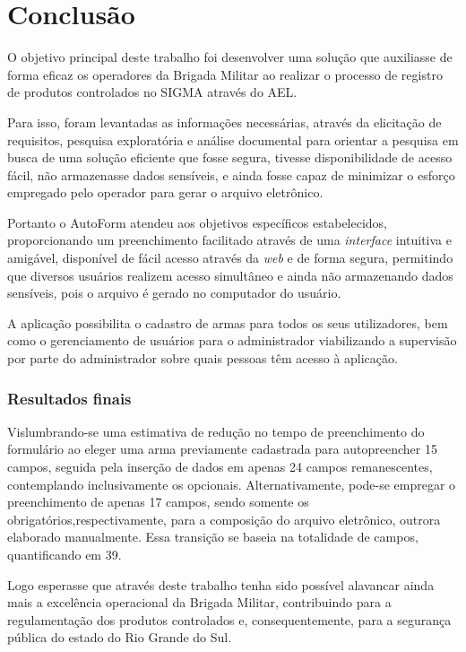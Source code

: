 \chapter{Conclusão}
O objetivo principal deste trabalho foi desenvolver uma solução que auxiliasse de forma eficaz os operadores da Brigada Militar ao realizar o processo de registro de produtos controlados no SIGMA através do AEL.

Para isso, foram levantadas as informações necessárias, através da elicitação de requisitos, pesquisa exploratória e análise documental para orientar a pesquisa em busca de uma solução eficiente que fosse segura, tivesse disponibilidade de acesso fácil, não armazenasse dados sensíveis, e ainda fosse capaz de minimizar o esforço empregado pelo operador para gerar o arquivo eletrônico.

Portanto o AutoForm atendeu aos objetivos específicos estabelecidos, proporcionando um preenchimento facilitado através de uma \textit{interface} intuitiva e amigável, disponível de fácil acesso através da \textit{web} e de forma segura, permitindo que diversos usuários realizem acesso simultâneo e ainda não armazenando dados sensíveis, pois o arquivo é gerado no computador do usuário.

A aplicação possibilita o cadastro de armas para todos os seus utilizadores, bem como o gerenciamento de usuários para o administrador viabilizando a supervisão por parte do administrador sobre quais pessoas têm acesso à aplicação.

\subsection{Resultados finais}

Vislumbrando-se uma estimativa de redução no tempo de preenchimento do formulário ao eleger uma arma previamente cadastrada para autopreencher 15 campos, seguida pela inserção de dados em apenas 24 campos remanescentes, contemplando inclusivamente os opcionais. 
Alternativamente, pode-se empregar o preenchimento de apenas 17 campos, sendo somente os obrigatórios,respectivamente, para a composição do arquivo eletrônico, outrora elaborado manualmente. Essa transição se baseia na totalidade de campos, quantificando em 39.


Logo esperasse que através deste trabalho tenha sido possível alavancar ainda mais a excelência operacional da Brigada Militar, contribuindo para a regulamentação dos produtos controlados e, consequentemente, para a segurança pública do estado do Rio Grande do Sul.


